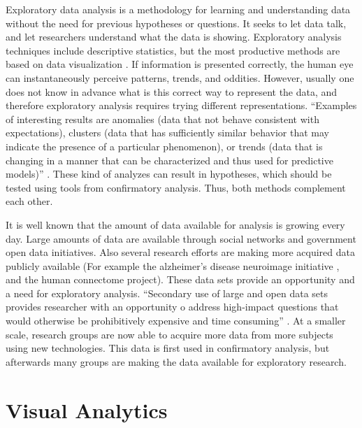 Exploratory data analysis is a methodology for learning and understanding data without the need for previous hypotheses or questions. It seeks to let data talk, and let researchers understand what the data is showing. Exploratory analysis techniques include descriptive statistics, but the most productive methods are based on data visualization \autocite{tukey_exploratory_1977}. If information is presented correctly, the human eye can instantaneously perceive patterns, trends, and oddities. However, usually one does not know in advance what is this correct way to represent the data, and therefore exploratory analysis requires trying different representations. 
``Examples of interesting results are anomalies (data that not behave consistent with expectations), clusters (data that has sufficiently similar behavior that may indicate the presence of a particular phenomenon), or trends (data that is changing in a manner that can be characterized and thus used for predictive models)'' \autocite{ward_interactive_2010}.
These kind of analyzes can result in hypotheses, which should be tested using tools from confirmatory analysis. Thus, both methods complement each other.

It is well known that the amount of data available for analysis is growing every day. Large amounts of data are available through social networks and government open data initiatives. Also several research efforts are making more acquired data publicly available (For example the alzheimer's disease neuroimage initiative \autocite{jack_alzheimers_2008}, and the human connectome project\autocite{marcus_human_2013}). These data sets provide an opportunity and a need for exploratory analysis. ``Secondary use of large and open data sets provides researcher with an opportunity o address high-impact questions that would otherwise be prohibitively expensive and time consuming'' \autocite{viangteeravat_giving_2014}. At a smaller scale, research groups are now able to acquire more data from more subjects using new technologies. This data is first used in confirmatory analysis, but afterwards many groups are making the data available for exploratory research. 

\section{Visual Analytics}

%

